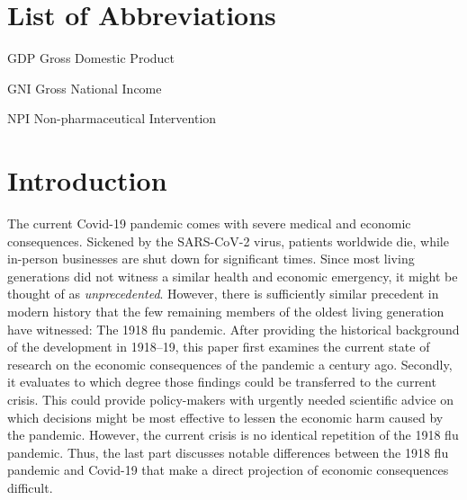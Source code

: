 \documentclass[12pt,a4paper]{article}
\let\oldquote\quote
\let\endoldquote\endquote
\renewenvironment{quote}[2][]
{\if\relax\detokenize{#1}\relax
	\def\quoteauthor{#2}%
	\else
	\def\quoteauthor{#2~---~#1}%
	\fi
	\oldquote}
{\par\nobreak\smallskip\hfill(\quoteauthor)%
	\endoldquote\addvspace{\bigskipamount}}
\begin{document}
\pagebreak
\pagestyle{plain}
\tableofcontents
\pagebreak
\newpage
{}
 
\section*{List of Abbreviations}
 
\begin{abbrv}
 
\item[GDP]			Gross Domestic Product
\item[GNI]			Gross National Income
\item[NPI]			Non-pharmaceutical Intervention

\end{abbrv}
\newpage
\setcounter{page}{2}
\setlength{\baselineskip}{1.5\baselineskip}
\pagestyle{plain}


\section{Introduction}


The current Covid-19 pandemic comes with severe medical and economic consequences.
Sickened by the SARS-CoV-2 virus, patients worldwide die, while in-person businesses are shut down for significant times.
Since most living generations did not witness a similar health and economic emergency, it might be thought of as \textit{unprecedented}.
However, there is sufficiently similar precedent in modern history that the few remaining members of the oldest living generation have witnessed: The 1918 flu pandemic.
After providing the historical background of the development in 1918--19, this paper first examines the current state of research on the economic consequences of the pandemic a century ago.
Secondly, it evaluates to which degree those findings could be transferred to the current crisis.
This could provide policy-makers with urgently needed scientific advice on which decisions might be most effective to lessen the economic harm caused by the pandemic.
However, the current crisis is no identical repetition of the 1918 flu pandemic.
Thus, the last part discusses notable differences between the 1918 flu pandemic and Covid-19 that make a direct projection of economic consequences difficult.
\end{document}

